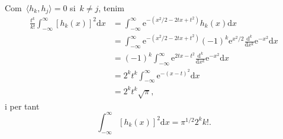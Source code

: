 \documentclass[a4paper]{article}
\theoremstyle{plain}
\theoremstyle{definition}
\newcommand{\e}{\mathrm{e}}
\providecommand{\uppi}{\pi}
\newcommand{\diff}{\mathrm{d}}
\begin{document}
Com~\(\langle h_{k}, h_{j}\rangle=0\) si~\(k\neq j\), tenim
\begin{align*}
    \frac{t^{k}}{k!}
    \int_{-\infty}^{\infty}
    [h_{k}(x)]^{2}
    \diff x &= \int_{-\infty}^{\infty}
               \e^{-(x^{2}/2-2tx+t^{2})}
               h_{k}(x)
               \diff x \\
            &= \int_{-\infty}^{\infty}
               \e^{-(x^{2}/2-2tx+t^{2})}
               (-1)^{k}
               \e^{x^{2}/2}
               \frac{\diff^{k}}{\diff x^{k}}
               \e^{-x^{2}}
               \diff x \\
            &= (-1)^{k}
               \int_{-\infty}^{\infty}
               \e^{2tx-t^{2}}
               \frac{\diff^{k}}{\diff x^{k}}
               \e^{-x^{2}}
               \diff x \\
            &= 2^{k}t^{k}
               \int_{-\infty}^{\infty}
               \e^{-(x-t)^{2}}
               \diff x \\
            &= 2^{k}t^{k}\sqrt{\uppi},
\end{align*}
i per tant
\[
    \int_{-\infty}^{\infty}
    [h_{k}(x)]^{2}\diff x
    =
    \uppi^{1/2}2^{k}k!.
\]
\end{document}
